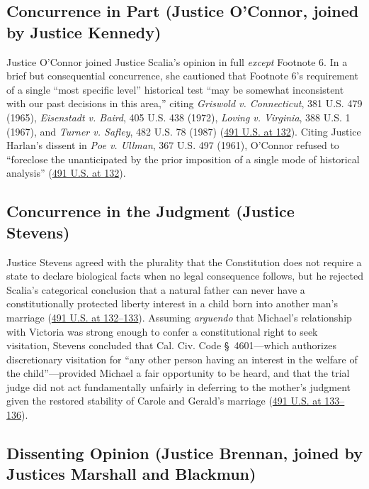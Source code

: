 \documentclass[12pt]{article}
\begin{document}
\subsection{Concurrence in Part (Justice O'Connor, joined by Justice Kennedy)}

Justice O'Connor joined Justice Scalia's opinion in full \textit{except} Footnote 6. In a brief but consequential concurrence, she cautioned that Footnote 6's requirement of a single ``most specific level'' historical test ``may be somewhat inconsistent with our past decisions in this area,'' citing \textit{Griswold v. Connecticut}, 381 U.S. 479 (1965), \textit{Eisenstadt v. Baird}, 405 U.S. 438 (1972), \textit{Loving v. Virginia}, 388 U.S. 1 (1967), and \textit{Turner v. Safley}, 482 U.S. 78 (1987) (\href{https://supreme.justia.com/cases/federal/us/491/110/}{491 U.S. at 132}). Citing Justice Harlan's dissent in \textit{Poe v. Ullman}, 367 U.S. 497 (1961), O'Connor refused to ``foreclose the unanticipated by the prior imposition of a single mode of historical analysis'' (\href{https://supreme.justia.com/cases/federal/us/491/110/}{491 U.S. at 132}).

\subsection{Concurrence in the Judgment (Justice Stevens)}

Justice Stevens agreed with the plurality that the Constitution does not require a state to declare biological facts when no legal consequence follows, but he rejected Scalia's categorical conclusion that a natural father can never have a constitutionally protected liberty interest in a child born into another man's marriage (\href{https://supreme.justia.com/cases/federal/us/491/110/}{491 U.S. at 132--133}). Assuming \textit{arguendo} that Michael's relationship with Victoria was strong enough to confer a constitutional right to seek visitation, Stevens concluded that Cal. Civ. Code \S~4601---which authorizes discretionary visitation for ``any other person having an interest in the welfare of the child''---provided Michael a fair opportunity to be heard, and that the trial judge did not act fundamentally unfairly in deferring to the mother's judgment given the restored stability of Carole and Gerald's marriage (\href{https://supreme.justia.com/cases/federal/us/491/110/}{491 U.S. at 133--136}).

\subsection{Dissenting Opinion (Justice Brennan, joined by Justices Marshall and Blackmun)}
\end{document}
